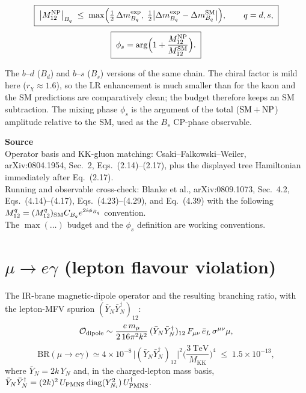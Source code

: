 \documentclass[11pt]{article}
\newcommand{\MKK}{M_{\mathrm{KK}}}
\newcommand{\Mtwelve}{M_{12}}
\newenvironment{srcbox}{\begin{srcboxframe}\small\raggedright\sloppy}{\end{srcboxframe}}
\begin{document}
\begin{equation}
\boxed{\;
\big|\Mtwelve^{\rm NP}\big|_{B_q}\;\le\;
\max\!\Big(\tfrac12\,\Delta m_{B_q}^{\rm exp},\;
\tfrac12\big|\Delta m_{B_q}^{\rm exp}-\Delta m_{B_q}^{\rm SM}\big|\Big),
\qquad q=d,s,
\;}
\end{equation}
\begin{equation}
\boxed{\;
\phi_s = \arg\!\Big(1+\frac{\Mtwelve^{\rm NP}}{\Mtwelve^{\rm SM}}\Big).
\;}
\end{equation}

\noindent The $b$--$d$ ($B_d$) and $b$--$s$ ($B_s$) versions of the same chain.
The chiral factor is mild here ($r_\chi\approx1.6$), so the LR enhancement is much
smaller than for the kaon and the SM predictions are comparatively clean; the
budget therefore keeps an SM subtraction. The mixing phase $\phi_s$ is the argument
of the total ($\rm SM+NP$) amplitude relative to the SM, used as the $B_s$ CP-phase
observable.

\begin{srcbox}
\textbf{Source}\\[2pt]
Operator basis and KK-gluon matching:
Csaki--Falkowski--Weiler, arXiv:0804.1954, Sec.~2, Eqs.~(2.14)--(2.17), plus
the displayed tree Hamiltonian immediately after Eq.~(2.17).\\[2pt]
Running and observable cross-check: Blanke et al., arXiv:0809.1073, Sec.~4.2,
Eqs.~(4.14)--(4.17), Eqs.~(4.23)--(4.29), and Eq.~(4.39) with the following
$M_{12}^q=(M_{12}^q)_{\rm SM}C_{B_q}e^{2i\phi_{B_q}}$ convention.\\[2pt]
The $\max(\dots)$ budget and the $\phi_s$ definition
are working conventions.
\end{srcbox}

\bigskip
\section*{$\mu\to e\gamma$ (lepton flavour violation)}

\noindent The IR-brane magnetic-dipole operator and the resulting
branching ratio, with the lepton-MFV spurion $(\bar Y_N\bar Y_N^\dagger)_{12}$:
\begin{equation}
\mathcal{O}_{\rm dipole}\sim
\frac{e\,m_\mu}{2\,16\pi^2 k^2}\,(\bar Y_N\bar Y_N^\dagger)_{12}\,
F_{\mu\nu}\,\bar e_L\,\sigma^{\mu\nu}\mu ,
\end{equation}
\begin{equation}
\boxed{\;
\mathrm{BR}(\mu\to e\gamma)\simeq
4\times10^{-8}\,\big|(\bar Y_N\bar Y_N^\dagger)_{12}\big|^2
\Big(\frac{3~\mathrm{TeV}}{\MKK}\Big)^4
\;\le\; 1.5\times10^{-13},
\;}
\end{equation}
where $\bar Y_N=2k\,Y_N$ and, in the charged-lepton mass basis,
$\bar Y_N\bar Y_N^\dagger=(2k)^2\,U_{\rm PMNS}\,\mathrm{diag}(Y_{N_i}^2)\,
U_{\rm PMNS}^\dagger$.
\end{document}

